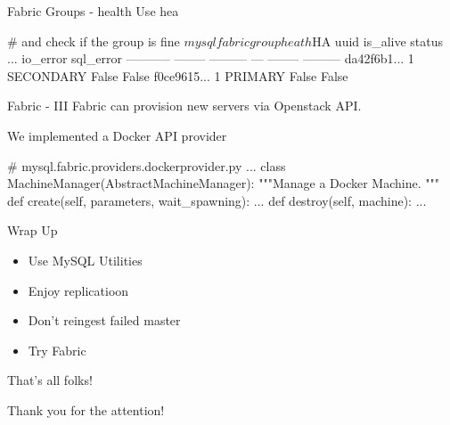 \documentclass{beamer}[10]
\begin{document}
\begin{pyframe}{Fabric Groups - health}
Use hea
\begin{bashcode}

# and check if the group is fine
$ mysqlfabric group heath $HA
       uuid is_alive    status ... io_error sql_error
----------- -------- --------- --- -------- ---------
da42f6b1...        1 SECONDARY        False     False
f0ce9615...        1   PRIMARY        False     False
\end{bashcode}
\end{pyframe}


\begin{pyframe}{Fabric - III}
Fabric can provision new servers via Openstack API.


We implemented a Docker API provider
\begin{pycode*}
# mysql.fabric.providers.dockerprovider.py
...
class MachineManager(AbstractMachineManager):
    """Manage a Docker Machine.
    """
    def create(self, parameters, wait_spawning):
        ...
    def destroy(self, machine):
        ...

\end{pycode*}
\end{pyframe}


\begin{pyframe}{Wrap Up}
\begin{itemize}
\item Use MySQL Utilities
\item Enjoy replicatioon
\item Don't reingest failed master
\item Try Fabric
\end{itemize}
\end{pyframe}

\begin{pyframe}{That's all folks!}
\begin{center}
Thank you for the attention! \\ \\
\insertauthor
\end{center}
\end{pyframe}

\end{document}
